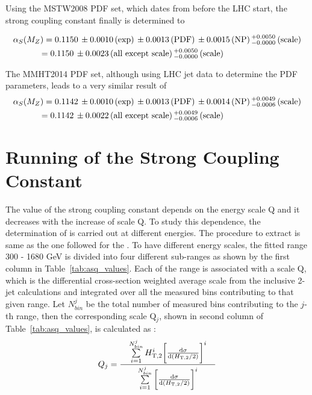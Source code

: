 Using the MSTW2008 PDF set, which dates from before the LHC start, the strong coupling constant finally is determined to

\begin{equation}
\begin{gathered}
  \alpsmz = 0.1150\,\pm0.0010\,\textrm{(exp)}\,\pm0.0013\,\textrm{(PDF)}\,\pm0.0015\,\textrm{(NP)}\,^{+0.0050}_{-0.0000}\,\textrm{(scale)}\\
  \hspace*{-20mm} = 0.1150\,\pm0.0023\,\textrm{(all except scale)}\,^{+0.0050}_{-0.0000}\,\textrm{(scale)}\,
\end{gathered}
\end{equation}

The MMHT2014 PDF set, although using LHC jet data to determine the PDF parameters, leads to a very similar result of
\begin{equation}
\begin{gathered}
  \alpsmz = 0.1142\,\pm0.0010\,\textrm{(exp)}\,\pm0.0013\,\textrm{(PDF)}\,\pm0.0014\,\textrm{(NP)}\,^{+0.0049}_{-0.0006}\,\textrm{(scale)}\\
  \hspace*{-20mm} = 0.1142\,\pm0.0022\,\textrm{(all except scale)}\,^{+0.0049}_{-0.0006}\,\textrm{(scale)}\,
\end{gathered}
\end{equation}

\section{Running of the Strong Coupling Constant}
The value of the strong coupling constant \alps depends on the energy scale Q and it decreases with the increase of scale Q. To study this dependence, the determination of \alps is carried out at different energies. The procedure to extract \alpsq is same as the one followed for the \alpsmz. To have different energy scales, the fitted \httwo range 300 - 1680 GeV is divided into four different sub-ranges as shown by the first column in Table~\ref{tab:asq_values}. Each of the \httwo range is associated with a scale Q, which is the differential cross-section weighted average \httwo scale from the inclusive 2-jet calculations and integrated over all the measured \httwo bins contributing to that given \httwo range. Let $N^{j}_{bin}$ be the total number of measured \httwo bins contributing to the $j$-th \httwo range, then the corresponding scale Q$_{j}$, shown in second column of Table~\ref{tab:asq_values}, is calculated as :
\begin{equation}
Q_{j} = \frac[10pt]{\sum\limits_{i=1}^{N^{j}_{bin}} H^{i}_{\rm T,2} \bigg[{\dd{\sigma}{(\httwo)}}\bigg]^{i}}{\sum\limits_{i=1}^{N^{j}_{bin}} \bigg[{\dd{\sigma}{(\httwo)}}\bigg]^{i}}
\end{equation}

